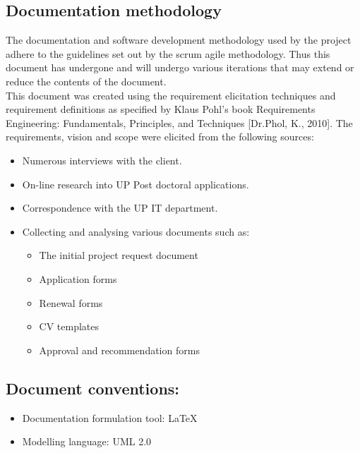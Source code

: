 \documentclass[12pt]{article}
\begin{document}
\vspace{0.2in}

\subsection{Documentation methodology}
\vspace{0.2in}
\begin{flushleft}
The documentation and software development methodology used by the project adhere to the guidelines set out by the scrum agile methodology. Thus this document has undergone and will undergo various iterations that may extend or reduce the contents of the document.\\

This document was created using the requirement elicitation techniques and requirement definitions as specified by Klaus Pohl’s book Requirements Engineering: Fundamentals, Principles, and Techniques [Dr.Phol, K., 2010].
The requirements, vision and scope were elicited from the following sources:
\begin{itemize}
	\item Numerous interviews with the client.
	\item On-line research into UP Post doctoral applications.
	\item Correspondence with the UP IT department.
	\item Collecting and analysing various documents such as:
		\begin{itemize}
			\item The initial project request document
			\item Application forms
			\item Renewal forms
			\item CV templates
			\item Approval and recommendation forms
		\end{itemize}
\end{itemize}
\end{flushleft}	

\vspace{0.5in}

\subsection{Document conventions:}
\vspace{0.1in}
\begin{itemize}
\item Documentation formulation tool: LaTeX
\item Modelling language: UML 2.0
\end{itemize}
\end{document}

